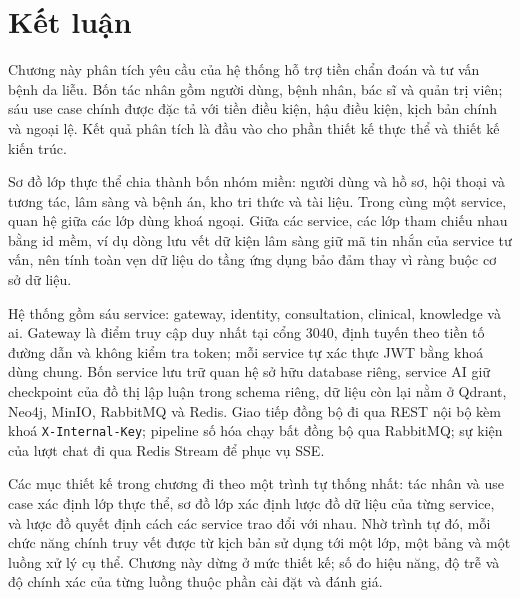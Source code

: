 \section{Kết luận}

Chương này phân tích yêu cầu của hệ thống hỗ trợ tiền chẩn đoán và tư vấn bệnh da liễu. Bốn tác nhân gồm người dùng, bệnh nhân, bác sĩ và quản trị viên; sáu use case chính được đặc tả với tiền điều kiện, hậu điều kiện, kịch bản chính và ngoại lệ. Kết quả phân tích là đầu vào cho phần thiết kế thực thể và thiết kế kiến trúc.

Sơ đồ lớp thực thể chia thành bốn nhóm miền: người dùng và hồ sơ, hội thoại và tương tác, lâm sàng và bệnh án, kho tri thức và tài liệu. Trong cùng một service, quan hệ giữa các lớp dùng khoá ngoại. Giữa các service, các lớp tham chiếu nhau bằng id mềm, ví dụ dòng lưu vết dữ kiện lâm sàng giữ mã tin nhắn của service tư vấn, nên tính toàn vẹn dữ liệu do tầng ứng dụng bảo đảm thay vì ràng buộc cơ sở dữ liệu.

Hệ thống gồm sáu service: gateway, identity, consultation, clinical, knowledge và ai. Gateway là điểm truy cập duy nhất tại cổng 3040, định tuyến theo tiền tố đường dẫn và không kiểm tra token; mỗi service tự xác thực JWT bằng khoá dùng chung. Bốn service lưu trữ quan hệ sở hữu database riêng, service AI giữ checkpoint của đồ thị lập luận trong schema riêng, dữ liệu còn lại nằm ở Qdrant, Neo4j, MinIO, RabbitMQ và Redis. Giao tiếp đồng bộ đi qua REST nội bộ kèm khoá \texttt{X-Internal-Key}; pipeline số hóa chạy bất đồng bộ qua RabbitMQ; sự kiện của lượt chat đi qua Redis Stream để phục vụ SSE.

Các mục thiết kế trong chương đi theo một trình tự thống nhất: tác nhân và use case xác định lớp thực thể, sơ đồ lớp xác định lược đồ dữ liệu của từng service, và lược đồ quyết định cách các service trao đổi với nhau. Nhờ trình tự đó, mỗi chức năng chính truy vết được từ kịch bản sử dụng tới một lớp, một bảng và một luồng xử lý cụ thể. Chương này dừng ở mức thiết kế; số đo hiệu năng, độ trễ và độ chính xác của từng luồng thuộc phần cài đặt và đánh giá.
